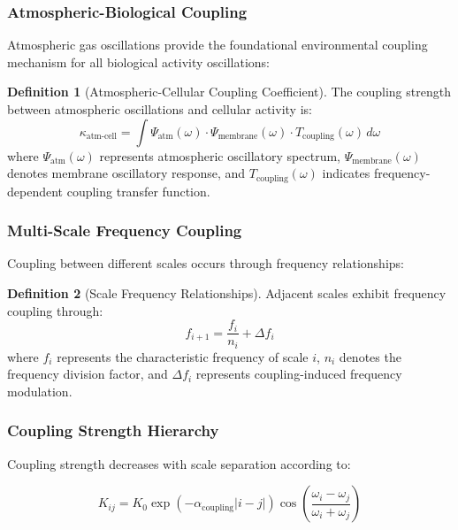 \documentclass[12pt,a4paper]{article}
\theoremstyle{definition}
\newtheorem{definition}{Definition}[section]
\begin{document}
\subsubsection{Atmospheric-Biological Coupling}

Atmospheric gas oscillations provide the foundational environmental coupling mechanism for all biological activity oscillations:

\begin{definition}[Atmospheric-Cellular Coupling Coefficient]
The coupling strength between atmospheric oscillations and cellular activity is:
\begin{equation}
\kappa_{\text{atm-cell}} = \int \Psi_{\text{atm}}(\omega) \cdot \Psi_{\text{membrane}}(\omega) \cdot T_{\text{coupling}}(\omega) \, d\omega
\end{equation}
where $\Psi_{\text{atm}}(\omega)$ represents atmospheric oscillatory spectrum, $\Psi_{\text{membrane}}(\omega)$ denotes membrane oscillatory response, and $T_{\text{coupling}}(\omega)$ indicates frequency-dependent coupling transfer function.
\end{definition}

\subsubsection{Multi-Scale Frequency Coupling}

Coupling between different scales occurs through frequency relationships:

\begin{definition}[Scale Frequency Relationships]
Adjacent scales exhibit frequency coupling through:
\begin{equation}
f_{i+1} = \frac{f_i}{n_i} + \Delta f_i
\end{equation}
where $f_i$ represents the characteristic frequency of scale $i$, $n_i$ denotes the frequency division factor, and $\Delta f_i$ represents coupling-induced frequency modulation.
\end{definition}

\subsubsection{Coupling Strength Hierarchy}

Coupling strength decreases with scale separation according to:

\begin{equation}
K_{ij} = K_0 \exp\left(-\alpha_{\text{coupling}}|i-j|\right) \cos\left(\frac{\omega_i - \omega_j}{\omega_i + \omega_j}\right)
\end{equation}
\end{document}

